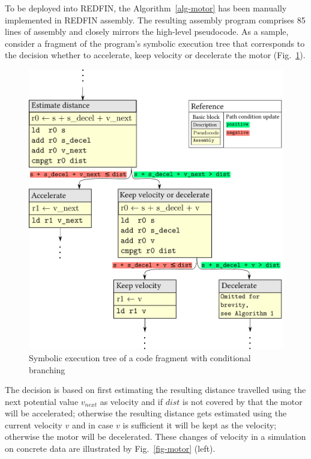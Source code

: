 To be deployed into REDFIN, the Algorithm~\ref{alg-motor} has been manually
implemented in REDFIN assembly. The resulting assembly program comprises 85 lines of
assembly and closely mirrors the high-level pseudocode. As a sample, consider a fragment of
the program's symbolic execution tree that corresponds to the decision whether to
accelerate, keep velocity or decelerate the motor (Fig.~\ref{fig-sym-tree}).

\begin{figure}[h]
\centerline{\includegraphics[scale=0.4]{fig/sym-tree.pdf}}
\caption{Symbolic execution tree of a code fragment with conditional branching\label{fig-sym-tree}}
\end{figure}

The decision is based on first estimating the resulting distance travelled using
the next potential value $v_{next}$ as velocity and if $dist$ is not covered by that
the motor will be accelerated; otherwise the resulting distance gets estimated
using the current velocity $v$ and in case $v$ is sufficient it will be kept as the
velocity; otherwise the motor will be decelerated. These changes of velocity in
a simulation on concrete data are illustrated by Fig.~\ref{fig-motor} (left).

